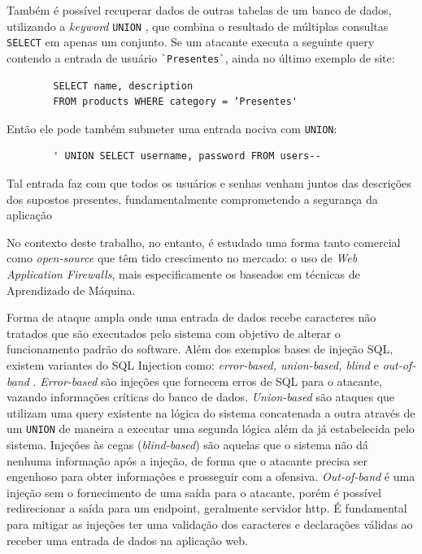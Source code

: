 \begin{alineas}
    \item
    Também é possível recuperar dados de outras tabelas de um banco de dados, utilizando a \textit{keyword} \verb+UNION+ \cite{mysql_union}, que combina o resultado de múltiplas consultas \verb+SELECT+ em apenas um conjunto. Se um atacante executa a seguinte query contendo a entrada de usuário \verb+`Presentes`+, ainda no último exemplo de site:
    
    \begin{verbatim}
        SELECT name, description
        FROM products WHERE category = ‘Presentes'
    \end{verbatim}
    
    Então ele pode também submeter uma entrada nociva com \verb+UNION+:
    
    \begin{verbatim}
        ' UNION SELECT username, password FROM users--
    \end{verbatim}
        
    Tal entrada faz com que todos os usuários e senhas venham juntos das descrições dos supostos presentes, fundamentalmente comprometendo a segurança da aplicação

\end{alineas}


No contexto deste trabalho, no entanto, é estudado uma forma tanto comercial como \textit{open-source}  que têm tido crescimento no mercado: o uso de \textit{Web Application Firewalls}, mais especificamente os baseados em técnicas de Aprendizado de Máquina.

Forma de ataque ampla onde uma entrada de dados recebe caracteres não tratados que são executados pelo sistema com objetivo de alterar o funcionamento padrão do software.
Além dos exemplos bases de injeção SQL, existem variantes \cite{bach_owasp2020understanding} do SQL Injection como: \textit{error-based, union-based, blind} e \textit{out-of-band} \cite{out_of_band_sql_invicti}. \textit{Error-based} são injeções que fornecem erros de SQL para o atacante, vazando informações críticas do banco de dados. \textit{Union-based} são ataques que utilizam uma query existente na lógica do sistema concatenada a outra através de um \verb+UNION+ de maneira a executar uma segunda lógica além da já estabelecida pelo sistema. Injeções às cegas (\textit{blind-based}) são aquelas que o sistema não dá nenhuma informação após a injeção, de forma que o atacante precisa ser engenhoso para obter informações e prosseguir com a ofensiva. \textit{Out-of-band} é uma injeção sem o fornecimento de uma saída para o atacante, porém é possível redirecionar a saída para um endpoint, geralmente servidor http.
É fundamental para mitigar as injeções ter uma validação dos caracteres e declarações válidas ao receber uma entrada de dados na aplicação web.

